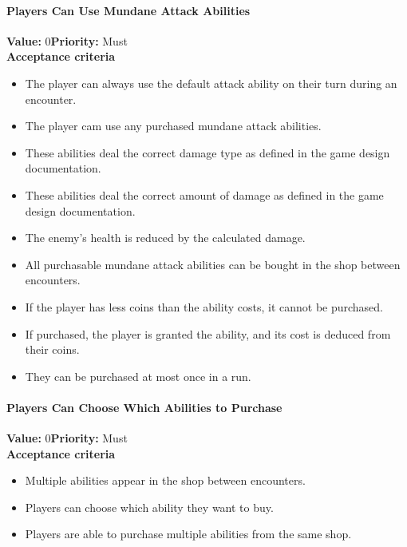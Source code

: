 \paragraph{Players Can Use Mundane Attack Abilities}
\textbf{Value:} 0\quad \textbf{Priority:} Must\\
\textbf{Acceptance criteria}
\begin{itemize}
  \item The player can always use the default attack ability on their turn during an encounter.
  \item The player cam use any purchased mundane attack abilities.
  \item These abilities deal the correct damage type as defined in the game design documentation.
  \item These abilities deal the correct amount of damage as defined in the game design documentation.
  \item The enemy's health is reduced by the calculated damage.
  \item All purchasable mundane attack abilities can be bought in the shop between encounters.
  \item If the player has less coins than the ability costs, it cannot be purchased. 
  \item If purchased, the player is granted the ability, and its cost is deduced from their coins. 
  \item They can be purchased at most once in a run. 
\end{itemize}

\paragraph{Players Can Choose Which Abilities to Purchase}
\textbf{Value:} 0\quad \textbf{Priority:} Must\\
\textbf{Acceptance criteria}
\begin{itemize}
  \item Multiple abilities appear in the shop between encounters.
  \item Players can choose which ability they want to buy.
  \item Players are able to purchase multiple abilities from the same shop.
\end{itemize}

